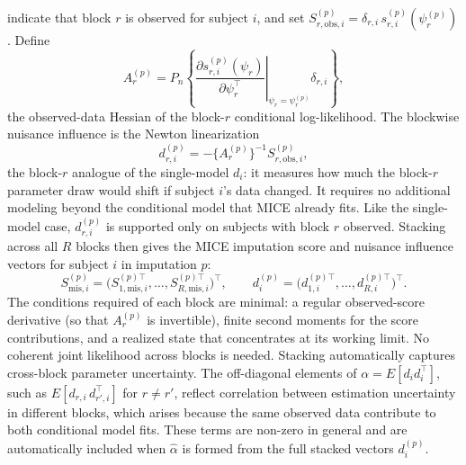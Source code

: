 indicate that block \(r\) is observed for subject \(i\), and set
\(S_{r,\mathrm{obs},i}^{(p)}=\delta_{r,i}\,s_{r,i}^{(p)}(\psi_r^{(p)})\).
Define
\[
A_r^{(p)}
=
P_n\!\left\{
\left.
\frac{\partial s_{r,i}^{(p)}(\psi_r)}{\partial\psi_r^\top}
\right|_{\psi_r=\psi_r^{(p)}}
\delta_{r,i}
\right\},
\]
the observed-data Hessian of the block-\(r\) conditional log-likelihood.
The blockwise nuisance influence is the Newton linearization
\[
d_{r,i}^{(p)}
=
-\{A_r^{(p)}\}^{-1}S_{r,\mathrm{obs},i}^{(p)},
\]
the block-\(r\) analogue of the single-model \(d_i\): it measures how
much the block-\(r\) parameter draw would shift if subject \(i\)'s data
changed.  It requires no additional modeling beyond the conditional model
that MICE already fits.  Like the single-model case, \(d_{r,i}^{(p)}\)
is supported only on subjects with block \(r\) observed.
Stacking across all \(R\) blocks then gives the MICE imputation score and
nuisance influence vectors for subject \(i\) in imputation \(p\):
\[
S_{\mathrm{mis},i}^{(p)}
=
\bigl(
S_{1,\mathrm{mis},i}^{(p)\top},\ldots,S_{R,\mathrm{mis},i}^{(p)\top}
\bigr)^\top,
\qquad
d_i^{(p)}
=
\bigl(
d_{1,i}^{(p)\top},\ldots,d_{R,i}^{(p)\top}
\bigr)^\top.
\]
The conditions required of each block are minimal: a regular
observed-score derivative (so that \(A_r^{(p)}\) is invertible), finite
second moments for the score contributions, and a realized state that
concentrates at its working limit.  No coherent joint likelihood across
blocks is needed.
Stacking automatically captures cross-block parameter uncertainty.  The
off-diagonal elements of \(\alpha = E[d_i d_i^\top]\), such as
\(E[d_{r,i}\,d_{r',i}^\top]\) for \(r\neq r'\), reflect correlation
between estimation uncertainty in different blocks, which arises because
the same observed data contribute to both conditional model fits.  These
terms are non-zero in general and are automatically included when
\(\widehat\alpha\) is formed from the full stacked vectors \(d_i^{(p)}\).
